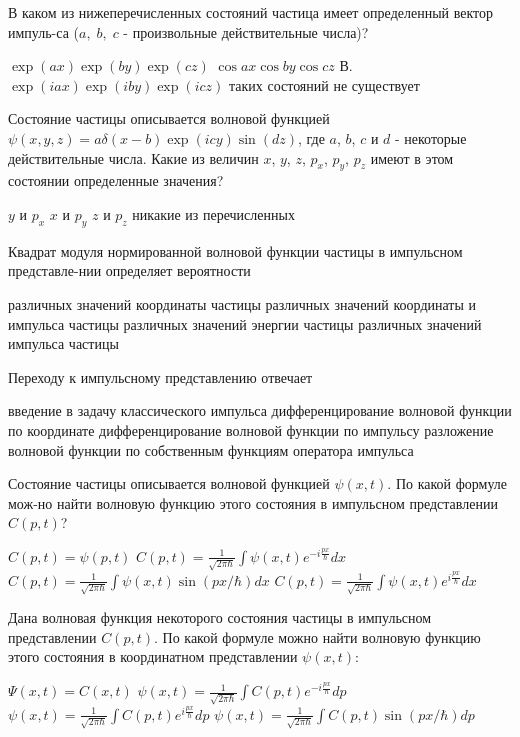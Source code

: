 \documentclass[11pt,a4paper]{exam}
\begin{document}
\begin{questions}
\question В каком из нижеперечисленных состояний частица имеет определенный вектор импуль-са ($a,\;b,\;c$ - произвольные действительные числа)?
\begin{choices}
\choice $\exp (ax)\exp (by)\exp (cz)$        
\choice $\cos ax\cos by\cos cz$
В.$\exp (iax)\exp (iby)\exp (icz)$        
\choice таких состояний не существует 
\end{choices}

\question Состояние частицы описывается волновой функцией $\psi (x,y,z) = a\delta (x - b)\exp (icy)\sin (dz)$, где $a$, $b$, $c$ и $d$ - некоторые действительные числа. Какие из величин $x$, $y$, $z$, ${p_x}$, ${p_y}$, ${p_z}$ имеют в этом состоянии определенные значения?
\begin{choices}
\choice $y$ и ${p_x}$      
\choice $x$ и ${p_y}$      
\choice $z$ и ${p_z}$      
\choice никакие из перечисленных
\end{choices}

\question Квадрат модуля нормированной волновой функции частицы в импульсном представле-нии определяет вероятности
\begin{choices}
\choice различных значений координаты частицы
\choice различных значений координаты и импульса частицы
\choice различных значений энергии частицы
\choice различных значений импульса частицы 
\end{choices}

\question Переходу к импульсному представлению отвечает
\begin{choices}
\choice введение в задачу классического импульса
\choice дифференцирование волновой функции по координате
\choice дифференцирование волновой функции по импульсу
\choice разложение волновой функции по собственным функциям оператора импульса
\end{choices}

\question Состояние частицы описывается волновой функцией $\psi (x,t)$. По какой формуле мож-но найти волновую функцию этого состояния в импульсном представлении $C(p,t)$?
\begin{choices}
\choice $C(p,t) = \psi (p,t)$             
\choice $C(p,t) = \frac{1}{{\sqrt {2\pi \hbar } }}\int {\psi (x,t){e^{ - i\frac{{px}}{\hbar }}}dx} $
\choice $C(p,t) = \frac{1}{{\sqrt {2\pi \hbar } }}\int {\psi (x,t)\sin \left( {px/\hbar } \right)dx} $      
\choice $C(p,t) = \frac{1}{{\sqrt {2\pi \hbar } }}\int {\psi (x,t){e^{i\frac{{px}}{\hbar }}}dx} $
\end{choices}

\question Дана волновая функция некоторого состояния частицы в импульсном представлении $C(p,t)$. По какой формуле можно найти волновую функцию этого состояния в координатном представлении $\psi (x,t)$:
\begin{choices}
\choice $\Psi (x,t) = C(x,t)$             
\choice $\psi (x,t) = \frac{1}{{\sqrt {2\pi \hbar } }}\int {C(p,t){e^{ - i\frac{{px}}{\hbar }}}dp} $  
\choice $\psi (x,t) = \frac{1}{{\sqrt {2\pi \hbar } }}\int {C(p,t){e^{i\frac{{px}}{\hbar }}}dp} $        
\choice $\psi (x,t) = \frac{1}{{\sqrt {2\pi \hbar } }}\int {C(p,t)\sin \left( {px/\hbar } \right)dp} $
\end{choices}


\end{questions}
\end{document}
